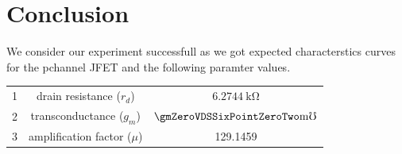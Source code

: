 \documentclass[../main.tex]{subfiles}
\begin{document}
\section{Conclusion}
 We consider our experiment successfull as we got expected characterstics curves for the pchannel JFET and the following paramter values.
\begin{table}[H]
	\centering
	\begin{tabular}{lcc}
		\toprule	
		1 & drain resistance ($r_d$) & $\qty{6.2744}{\kilo\ohm}$  \\
		2 & transconductance ($g_m$) & $\gmZeroVDSSixPointZeroTwo \unit{\milli\mho}$\\
		3 & amplification factor ($\mu$) & \num{129.1459} \\
		\bottomrule
	\end{tabular}
	\label{tab:results}
\end{table}
\end{document}
